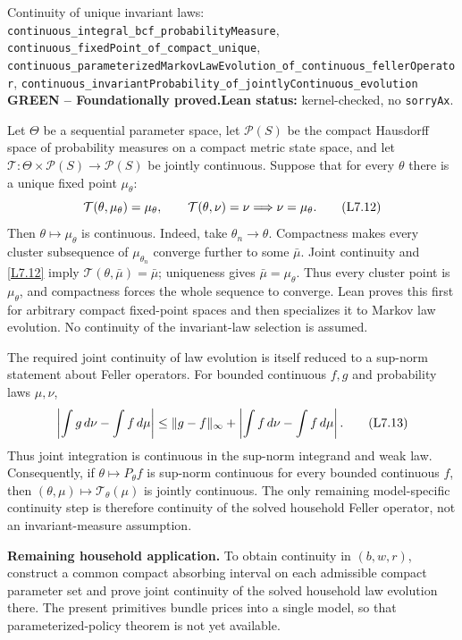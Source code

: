 \documentclass[11pt]{article}
\newcommand{\leanname}[1]{\nolinkurl{#1}}
\newcommand{\eqL}[1]{\refstepcounter{equation}\tag{L#1}}
\newcommand{\formalcheck}{\textbf{Lean status:} kernel-checked, no \texttt{sorryAx}.}
\newcommand{\greenstatus}{\textcolor{proved}{\textbf{GREEN -- Foundationally proved.}}}
\begin{document}
\begin{greenbox}{Continuity of unique invariant laws:
\leanname{continuous_integral_bcf_probabilityMeasure},
\leanname{continuous_fixedPoint_of_compact_unique},
\leanname{continuous_parameterizedMarkovLawEvolution_of_continuous_fellerOperator},
\leanname{continuous_invariantProbability_of_jointlyContinuous_evolution}}
\greenstatus\quad\formalcheck

Let $\Theta$ be a sequential parameter space, let $\mathcal P(S)$ be the
compact Hausdorff space of probability measures on a compact metric state
space, and let
\(\mathcal T:\Theta\times\mathcal P(S)\to\mathcal P(S)\) be jointly
continuous.  Suppose that for every $\theta$ there is a unique fixed point
$\mu_\theta$:
\begin{equation}
 \mathcal T(\theta,\mu_\theta)=\mu_\theta,
 \qquad
 \mathcal T(\theta,\nu)=\nu\Longrightarrow\nu=\mu_\theta.
 \eqL{7.12}\label{L7.12}
\end{equation}
Then $\theta\mapsto\mu_\theta$ is continuous.  Indeed, take
$\theta_n\to\theta$.  Compactness makes every cluster subsequence of
$\mu_{\theta_n}$ converge further to some $\bar\mu$.  Joint continuity and
\eqref{L7.12} imply
$\mathcal T(\theta,\bar\mu)=\bar\mu$; uniqueness gives
$\bar\mu=\mu_\theta$.  Thus every cluster point is $\mu_\theta$, and
compactness forces the whole sequence to converge.  Lean proves this first
for arbitrary compact fixed-point spaces and then specializes it to Markov
law evolution.  No continuity of the invariant-law selection is assumed.

The required joint continuity of law evolution is itself reduced to a
sup-norm statement about Feller operators.  For bounded continuous $f,g$ and
probability laws $\mu,\nu$,
\begin{equation}
 \left|\int g\,d\nu-\int f\,d\mu\right|
 \le \lVert g-f\rVert_\infty+
      \left|\int f\,d\nu-\int f\,d\mu\right|. \eqL{7.13}\label{L7.13}
\end{equation}
Thus joint integration is continuous in the sup-norm integrand and weak law.
Consequently, if $\theta\mapsto P_\theta f$ is sup-norm continuous for every
bounded continuous $f$, then
$(\theta,\mu)\mapsto\mathcal T_\theta(\mu)$ is jointly continuous.  The only
remaining model-specific continuity step is therefore continuity of the
solved household Feller operator, not an invariant-measure assumption.

\textbf{Remaining household application.}  To obtain continuity in
$(b,w,r)$, construct a common compact absorbing interval on each admissible
compact parameter set and prove joint continuity of the solved household law
evolution there.  The present primitives bundle prices into a single model,
so that parameterized-policy theorem is not yet available.
\end{greenbox}
\end{document}
